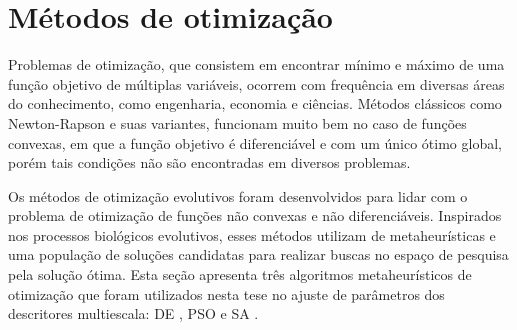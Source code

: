 \begin{comment}
In this paper, the Minkowski-Bouligand method estimates the fractal dimension ($D_f$) \citep{Costa:2009} and hence the \emph{MFD} descriptor. This estimation method dilates the shape under analysis  using a disk structuring element of radius $ r>0 $, successively. The slope of the linear interpolation of the curve $\log{A(r)}$ versus $\log{r}$ provides the $D_f$ estimation, given by: 

\begin{equation}
D_f = 2 - \lim_{r \to 0}  \frac{\log{A(r)}}{\log{r}}.
\label{eq:df}
\end{equation}
Then, the derivative of th log-log curve for $N$ discrete values of radii $r_i>0$ gives 

\begin{equation}
MFD = \big(D_f(t_1)\text{, }D_f(t_2)\text{, }\ldots\text{ , }D_f(t_N)\big), 
\label{eq:dfm}
\end{equation}

\noindent where  $D_f(t) = 2 - \frac{du(t)}{dt}$, $t = \log{r}$ and $u(t) = \log{A(t)}$.

\end{comment}

\section{Métodos de otimização}

Problemas de otimização, que consistem em encontrar mínimo e máximo de uma função objetivo de múltiplas variáveis, ocorrem com frequência em diversas áreas do conhecimento, como engenharia, economia e ciências. Métodos clássicos como Newton-Rapson e suas variantes, funcionam muito bem no caso de funções convexas, em que a função objetivo é diferenciável e com um único ótimo global, porém tais condições não são encontradas em diversos problemas. 

Os métodos de otimização evolutivos foram desenvolvidos para lidar com o problema de otimização de funções não convexas e não diferenciáveis. Inspirados nos processos biológicos evolutivos, esses métodos utilizam de metaheurísticas e uma população de soluções candidatas para realizar buscas no espaço de pesquisa pela solução ótima. Esta seção apresenta três algoritmos metaheurísticos de otimização que foram utilizados nesta tese no ajuste de parâmetros dos descritores multiescala: \acl{DE} \cite{Storn:1007}, \acl{PSO}  \cite{Yuhui:1998} e \acl{SA} \cite{Andries:2007}.

